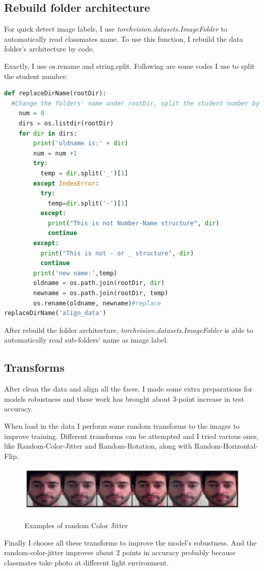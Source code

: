 \documentclass{article}
\begin{document}
\subsection{Rebuild folder architecture}
For quick detect image labels, I use \textit{torchvision.datasets.ImageFolder} to automatically read classmates name. To use this function, I rebuild the data folder's architecture by code.

Exactly, I use os.rename and string.split. Following are some codes I use to split the student number:

\begin{lstlisting}[language=Python, caption=Change folder names for ImageFloder function]
def replaceDirName(rootDir):
  #Change the folders' name under rootDir, split the student number by '-' or '_'
    num = 0
    dirs = os.listdir(rootDir)
    for dir in dirs:
        print('oldname is:' + dir)
        num = num +1
        try:
          temp = dir.split('_')[1]
        except IndexError:
          try:
            temp=dir.split('-')[1]
          except:
            print("This is not Number-Name structure", dir)
            continue
        except:
          print("This is not - or _ structure", dir)
          continue
        print('new name:',temp)
        oldname = os.path.join(rootDir, dir)
        newname = os.path.join(rootDir, temp)
        os.rename(oldname, newname)#replace
replaceDirName('align_data')
\end{lstlisting}




After rebuild the folder architecture, \textit{torchvision.datasets.ImageFolder} is able to automatically read sub-folders' name as image label. 

\subsection{Transforms}
After clean the data and align all the faces, I made some extra preparations for models robustness and these work has brought about 3-point increase in test accuracy.

When load in the data I perform some random transforms to the images to improve training. Different transforms can be attempted and I tried various ones, like Random-Color-Jitter and Random-Rotation, along with Random-Horizontal-Flip.
\begin{figure}[H]%
  \centering
  \caption{Examples of random Color Jitter}
  \includegraphics[width=\columnwidth]{IMG/随机彩色.png} %
  \label{Fig.RNN} %
\end{figure}
Finally I choose all these transforms to improve the model's robustness. And the random-color-jitter improves about 2 points in accuracy probably because classmates take photo at different light environment.
\end{document}
